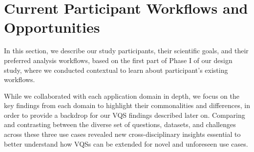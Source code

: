  \section{Current Participant Workflows and Opportunities\label{sec:participantdatasets}}
 In this section, we describe our study participants, their scientific goals, and their preferred analysis workflows, based on the first part of Phase I of our design study, where we conducted contextual  to learn about participant's existing workflows. %
 
 While we collaborated with each application domain in depth, we focus on the key findings from each domain to highlight their commonalities and differences, in order to provide a backdrop for our VQS findings described later on. Comparing and contrasting between the diverse set of questions, datasets, and challenges across these three use cases revealed new cross-disciplinary insights essential to better understand how VQSs can be extended for novel and unforeseen use cases.
